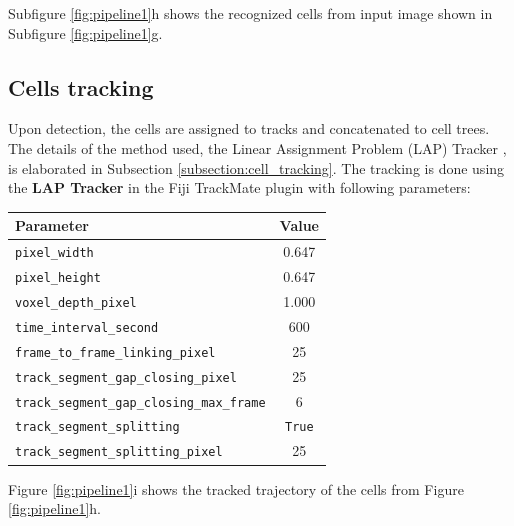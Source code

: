 \documentclass[pdftex,12pt,a4paper]{report}
\begin{document}
Subfigure \ref{fig:pipeline1}h shows the recognized cells from input image shown in Subfigure \ref{fig:pipeline1}g.

\subsection{Cells tracking}

Upon detection, the cells are assigned to tracks and concatenated to cell trees. The details of the method used, the Linear Assignment Problem (LAP) Tracker \cite{jaqaman2008robust}, is elaborated in Subsection \ref{subsection:cell_tracking}. The tracking is done using the \textbf{LAP Tracker} in the Fiji TrackMate plugin \cite{tinevez2017trackmate} with following parameters:

\begin{table}[H]
\centering
\begin{tabular}[t]{ l | c }
Parameter & Value \\
\hline
\texttt{pixel\_width} & 0.647 \\
\texttt{pixel\_height} & 0.647 \\
\texttt{voxel\_depth\_pixel} & 1.000 \\
\texttt{time\_interval\_second} & 600\\
\texttt{frame\_to\_frame\_linking\_pixel} & 25 \\
\texttt{track\_segment\_gap\_closing\_pixel} & 25 \\
\texttt{track\_segment\_gap\_closing\_max\_frame} & 6 \\
\texttt{track\_segment\_splitting} & \texttt{True} \\
\texttt{track\_segment\_splitting\_pixel} & 25 \\
\end{tabular}
\end{table}


Figure \ref{fig:pipeline1}i shows the tracked trajectory of the cells from Figure \ref{fig:pipeline1}h.

\end{document}
